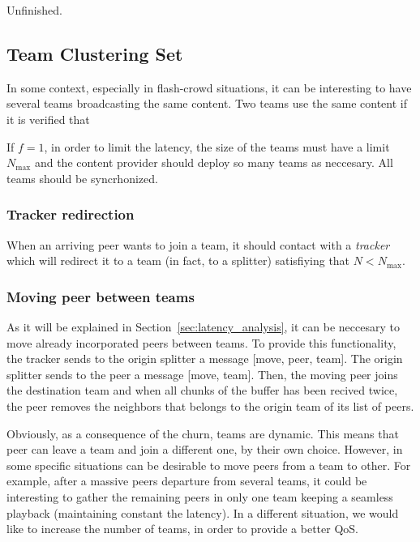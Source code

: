 
\begin{note}
  Unfinished.
\end{note}

\subsection{Team Clustering Set}
In some context, especially in flash-crowd situations, it can be
interesting to have several teams broadcasting the same content. Two
teams use the same content if it is verified that 

If $f=1$, in order to limit the latency, the size of the teams must
have a limit $N_\text{max}$ and the content provider should deploy so
many teams as neccesary. All teams should be syncrhonized.

\subsubsection{Tracker redirection}
When an arriving peer wants to join a team, it should contact with a
\emph{tracker} which will redirect it to a team (in fact, to a
splitter) satisfiying that $N<N_\text{max}$.

\subsubsection{Moving peer between teams}
As it will be explained in Section~\ref{sec:latency_analysis}, it can
be neccesary to move already incorporated peers between teams. To
provide this functionality, the tracker sends to the origin splitter a
message [move, peer, team]. The origin splitter sends to the peer a
message [move, team]. Then, the moving peer joins the destination team
and when all chunks of the buffer has been recived twice, the peer
removes the neighbors that belongs to the origin team of its list of
peers.


Obviously, as a consequence of the churn, teams are dynamic. This
means that peer can leave a team and join a different one, by their
own choice. However, in some specific situations can be desirable to
move peers from a team to other. For example, after a massive peers
departure from several teams, it could be interesting to gather the
remaining peers in only one team keeping a seamless playback
(maintaining constant the latency). In a different situation, we would
like to increase the number of teams, in order to provide a better
QoS.

